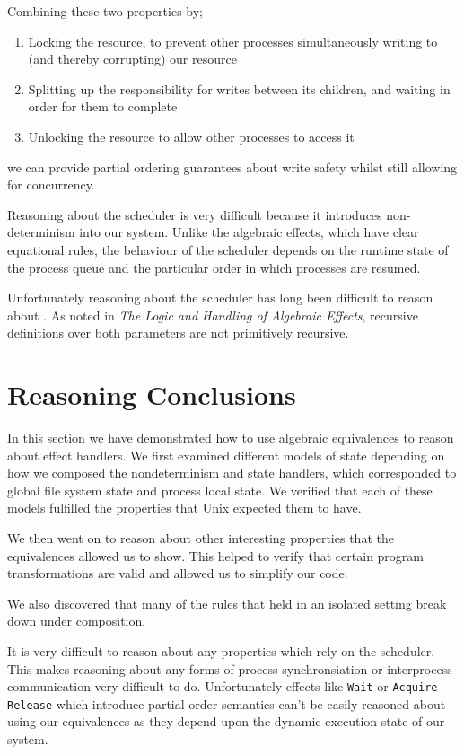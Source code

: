 \documentclass[logo,bsc,singlespacing,parskip]{infthesis}
\begin{document}
Combining these two properties by;
\begin{enumerate}
    \item Locking the resource, to prevent other processes simultaneously writing to (and thereby corrupting) our resource
    \item Splitting up the responsibility for writes between its children, and waiting in order for them to complete
    \item Unlocking the resource to allow other processes to access it
\end{enumerate}

we can provide partial ordering guarantees about write safety whilst still allowing for concurrency.


Reasoning about the scheduler is very difficult because it introduces non-determinism into our system. Unlike the algebraic effects, which have clear equational rules, the behaviour of the scheduler depends on the runtime state of the process queue and the particular order in which processes are resumed. 

Unfortunately reasoning about the scheduler has long been difficult to reason about \cite{}. As noted in \textit{The Logic and Handling of Algebraic Effects}, recursive definitions over both parameters are not primitively recursive.






\section{Reasoning Conclusions}

In this section we have demonstrated how to use algebraic equivalences to reason about effect handlers. We first examined different models of state depending on how we composed the nondeterminism and state handlers, which corresponded to global file system state and process local state. We verified that each of these models fulfilled the properties that Unix expected them to have. 

We then went on to reason about other interesting properties that the equivalences allowed us to show. This helped to verify that certain program transformations are valid and allowed us to simplify our code. 

We also discovered that many of the rules that held in an isolated setting break down under composition. 

It is very difficult to reason about any properties which rely on the scheduler. This makes reasoning about any forms of process synchronsiation or interprocess communication very difficult to do. Unfortunately effects like \lstinline{Wait} or \lstinline{Acquire} \lstinline{Release} which introduce partial order semantics can't be easily reasoned about using our equivalences as they depend upon the dynamic execution state of our system.
\end{document}
